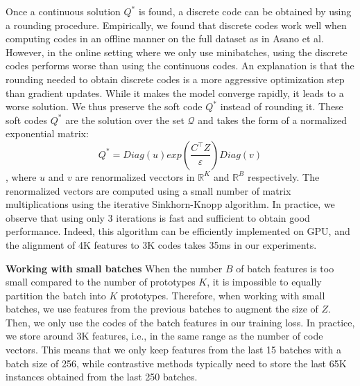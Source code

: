 \documentclass[conference]{IEEEtran}
\begin{document}
Once a continuous solution $Q^{*}$ is found, a discrete code can be obtained by using a rounding procedure.
Empirically, we found that discrete codes work well when computing codes in an offline manner on the full dataset as in Asano et al. 
However, in the online setting where we only use minibatches, using the discrete codes performs worse than using the continuous codes.
An explanation is that the rounding needed to obtain discrete codes is a more aggressive optimization step than gradient updates.
While it makes the model converge rapidly, it leads to a worse solution.
We thus preserve the soft code $Q^{*}$ instead of rounding it. These soft codes $Q^{*}$ are the solution over the set $\mathcal{Q}$ and takes the form of a normalized exponential matrix:
\begin{equation}
    Q^{*} = Diag(u)exp(\frac{C^{\top}Z}{\varepsilon})Diag(v)
\end{equation}
, where $u$ and $v$ are renormalized vecctors in $\mathbb{R}^K$ and $\mathbb{R}^B$ respectively. The renormalized vectors are computed using a small number of matrix multiplications using the iterative Sinkhorn-Knopp algorithm.
In practice, we observe that using only 3 iterations is fast and sufficient to obtain good performance.
Indeed, this algorithm can be efficiently implemented on GPU, and the alignment of 4K features to 3K codes takes 35ms in our experiments.

\textbf{Working with small batches} When the number $B$ of batch features is too small compared to the number of prototypes $K$, it is impossible to equally partition the batch into $K$ prototypes.
Therefore, when working with small batches, we use features from the previous batches to augment the size of $Z$. Then, we only use the codes of the batch features in our training loss.
In practice, we store around 3K features, i.e., in the same range as the number of code vectors.
This means that we only keep features from the last 15 batches with a batch size of 256, while contrastive methods typically need to store the last 65K instances obtained from the last 250 batches.
\end{document}
